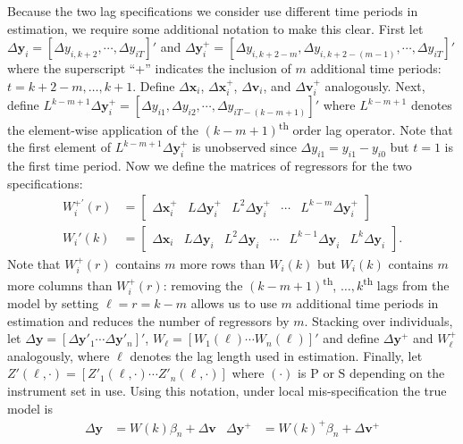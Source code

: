 Because the two lag specifications we consider use different time periods in estimation, we require some additional notation to make this clear. 
First let
$\Delta \mathbf{y}_{i} = [\Delta y_{i,k+2}, \cdots, \Delta y_{iT}]'$ and $\Delta \mathbf{y}^+_{i} = [\Delta y_{i,k+2-m}, \Delta y_{i,k+2-(m-1)}, \cdots, \Delta y_{iT}]'$ 
where the superscript ``+'' indicates the inclusion of $m$ additional time periods: $t = k+2-m, \ldots, k+1$.
Define $\Delta \mathbf{x}_i$, $\Delta \mathbf{x}_{i}^{+}$, $\Delta \mathbf{v}_i$, and $\Delta \mathbf{v}_{i}^{+}$ analogously.
Next, define $L^{k-m+1}\Delta \mathbf{y}_i^{+} = [\Delta y_{i1}, \Delta y_{i2}, \cdots, \Delta y_{iT-(k-m+1)}]'$ where $L^{k-m+1}$ denotes the element-wise application of the $(k-m+1)$\textsuperscript{th} order lag operator.
Note that the first element of $L^{k-m+1}\Delta \mathbf{y}_{i}^{+}$ is unobserved since $\Delta y_{i1} = y_{i1} - y_{i0}$ but $t=1$ is the first time period.
Now we define the matrices of regressors for the two specifications: 
\begin{align*}
  W_i^{+'}(r) &= \left[
  \begin{array}{ccccc}
    \Delta \mathbf{x}_i^+ & L \Delta \mathbf{y}_i^{+} &  L^2 \Delta \mathbf{y}_i^{+} & \cdots & L^{k-m}\Delta \mathbf{y}_i^{+} 
  \end{array}
\right]\\
  W_i'(k) &= \left[
  \begin{array}{cccccc}
    \Delta \mathbf{x}_i & L \Delta \mathbf{y}_i &  L^2 \Delta \mathbf{y}_i & \cdots & L^{k-1}\Delta \mathbf{y}_i & L^k\Delta \mathbf{y}_i 
  \end{array}
\right].
\end{align*}
Note that $W_i^{+}(r)$ contains $m$ more rows than $W_i(k)$ but $W_i(k)$ contains $m$ more columns than $W_i^{+}(r)$: removing the $(k-m+1)$\textsuperscript{th}, $\ldots, k$\textsuperscript{th} lags from the model by setting $\ell = r = k-m$ allows us to use $m$ additional time periods in estimation and reduces the number of regressors by $m$. 
Stacking over individuals, let $\Delta \mathbf{y} = [\Delta \mathbf{y}'_1 \cdots \Delta \mathbf{y}'_n]'$, $W_\ell = [W_1(\ell) \cdots W_n(\ell)]'$ and define $\Delta \mathbf{y}^{+}$ and $W_\ell^{+}$ analogously, where $\ell$ denotes the lag length used in estimation.
Finally, let $Z'(\ell,\cdot) = [Z'_1(\ell,\cdot) \cdots Z'_n(\ell,\cdot)]$ where $(\cdot)$ is $\text{P}$ or $\text{S}$ depending on the instrument set in use.
Using this notation, under local mis-specification the true model is
\begin{align}
  \Delta \mathbf{y} &= W(k)\beta_n + \Delta \mathbf{v} &  \Delta \mathbf{y}^{+} &= W(k)^{+}\beta_n + \Delta \mathbf{v}^+
\end{align}

